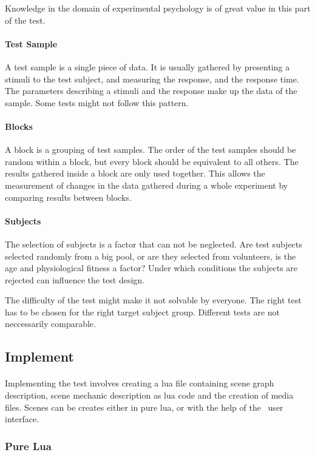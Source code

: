 Knowledge in the domain of experimental psychology is of great value in this part of the test.

\paragraph{Test Sample}
A test sample is a single piece of data.
It is usually gathered by presenting a stimuli to the test subject,
and measuring the response, and the response time.
The parameters describing a stimuli and the response make up the data of the sample.
Some tests might not follow this pattern.

\paragraph{Blocks}
A block is a grouping of test samples.
The order of the test samples should be random within a block, but every block should be equivalent to all others.
The results gathered inside a block are only used together.
This allows the measurement of changes in the data gathered during a whole experiment by comparing results between blocks.

\paragraph{Subjects}
The selection of subjects is a factor that can not be neglected.
Are test subjects selected randomly from a big pool, or are they selected from volunteers,
is the age and physiological fitness a factor?
Under which conditions the subjects are rejected can influence the test design.

The difficulty of the test might make it not solvable by everyone.
The right test has to be chosen for the right target subject group.
Different tests are not neccessarily comparable.


\subsection{Implement}
\paragraph{}
Implementing the test involves creating a lua file containing scene graph description,
scene mechanic description as lua code and the creation of media files.
Scenes can be creates either in pure lua, or with the help of the \ER\ user interface.

\subsubsection{Pure Lua}
